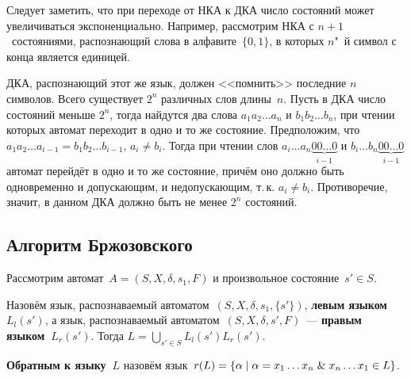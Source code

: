 Следует заметить, что при переходе от НКА к ДКА число состояний может увеличиваться экспоненциально.
Например, рассмотрим НКА с $n + 1$~состояниями, распознающий слова в алфавите~$\{ 0, 1 \}$, в которых $n$"~й символ с конца является единицей.
\begin{center}\noindent
{}
\end{center}

ДКА, распознающий этот же язык, должен <<помнить>> последние $n$ символов.
Всего существует $2^n$ различных слов длины~$n$.
Пусть в ДКА число состояний меньше $2^n$, тогда найдутся два слова $a_1 a_2 \ldots a_n$ и $b_1 b_2 \ldots b_n$, при чтении которых автомат переходит в одно и то же состояние.
Предположим, что $a_1 a_2 \ldots a_{i-1} = b_1 b_2 \ldots b_{i-1}$, $a_i \neq b_i$.
Тогда при чтении слов $a_i \ldots a_n \underbrace{00\ldots0}_{i-1}$ и $b_i \ldots b_n \underbrace{00\ldots0}_{i-1}$ автомат перейдёт в одно и то же состояние, причём оно должно быть одновременно и допускающим, и недопускающим, т.\,к. $a_i \neq b_i$.
Противоречие, значит, в данном ДКА должно быть не менее $2^n$ состояний.

\subsection{Алгоритм Бржозовского}
Рассмотрим автомат~$A = (S, X, \delta, s_1, F)$ и произвольное состояние~$s' \in S$.

Назовём язык, распознаваемый автоматом~$(S, X, \delta, s_1, \{ s' \})$, \textbf{левым языком~$L_l(s')$}, а язык, распознаваемый автоматом~$(S, X, \delta, s', F)$~--- \textbf{правым языком~$L_r(s')$}.
Тогда $L = \bigcup\limits_{s' \in S} L_l(s') L_r(s')$.

\textbf{Обратным к языку~$L$} назовём язык~$r(L) = \{ \alpha \mid \alpha = x_1 \ldots x_n \mathrel{\&} x_n \ldots x_1 \in L \}$.

